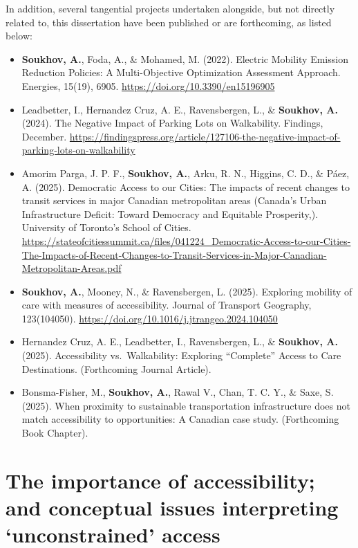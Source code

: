 \documentclass[
11pt, %
oneside, %
english, %
singlespacing, %
]{macthesis} %
\def\tightlist{}
\begin{document}
In addition, several tangential projects undertaken alongside, but not directly related to, this dissertation have been published or are forthcoming, as listed below:

\begin{itemize}
\tightlist
\item
  \textbf{Soukhov, A.}, Foda, A., \& Mohamed, M. (2022). Electric Mobility Emission Reduction Policies: A Multi-Objective Optimization Assessment Approach. Energies, 15(19), 6905. \url{https://doi.org/10.3390/en15196905}
\item
  Leadbetter, I., Hernandez Cruz, A. E., Ravensbergen, L., \& \textbf{Soukhov, A.} (2024). The Negative Impact of Parking Lots on Walkability. Findings, December. \url{https://findingspress.org/article/127106-the-negative-impact-of-parking-lots-on-walkability}
\item
  Amorim Parga, J. P. F., \textbf{Soukhov, A.}, Arku, R. N., Higgins, C. D., \& Páez, A. (2025). Democratic Access to our Cities: The impacts of recent changes to transit services in major Canadian metropolitan areas (Canada's Urban Infrastructure Deficit: Toward Democracy and Equitable Prosperity,). University of Toronto's School of Cities. \url{https://stateofcitiessummit.ca/files/041224_Democratic-Access-to-our-Cities-The-Impacts-of-Recent-Changes-to-Transit-Services-in-Major-Canadian-Metropolitan-Areas.pdf}
\item
  \textbf{Soukhov, A.}, Mooney, N., \& Ravensbergen, L. (2025). Exploring mobility of care with measures of accessibility. Journal of Transport Geography, 123(104050). \url{https://doi.org/10.1016/j.jtrangeo.2024.104050}
\item
  Hernandez Cruz, A. E., Leadbetter, I., Ravensbergen, L., \& \textbf{Soukhov, A.} (2025). Accessibility vs.~Walkability: Exploring ``Complete'' Access to Care Destinations. (Forthcoming Journal Article).
\item
  Bonsma-Fisher, M., \textbf{Soukhov, A.}, Rawal V., Chan, T. C. Y., \& Saxe, S. (2025). When proximity to sustainable transportation infrastructure does not match accessibility to opportunities: A Canadian case study. (Forthcoming Book Chapter).
\end{itemize}

\section{The importance of accessibility; and conceptual issues interpreting `unconstrained' access}\label{the-importance-of-accessibility-and-conceptual-issues-interpreting-unconstrained-access}
\end{document}
